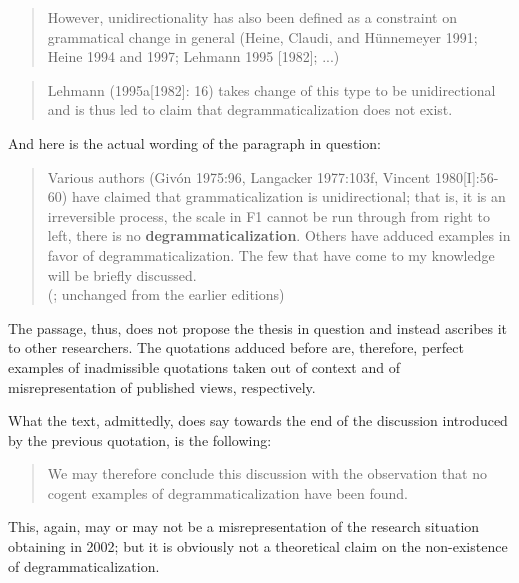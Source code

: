 \begin{quote}
However, unidirectionality has also been defined as a constraint on grammatical change in general (Heine, Claudi, and Hünnemeyer 1991; Heine 1994 and 1997; Lehmann 1995 [1982]; ...)\\
\citep[50]{Norde2009}
\end{quote}

\begin{quote}
Lehmann (1995a[1982]: 16) takes change of this type to be unidirectional and is thus led to claim that degrammaticalization does not exist.\\
\citep[163]{BörjarsEtAl2011}
\end{quote}

\noindent And here is the actual wording of the paragraph in question:

\begin{quote}
Various authors (Givón 1975:96, Langacker 1977:103f, Vincent 1980[I]:56-60) have claimed that grammaticalization is unidirectional; that is, it is an irreversible process, the scale in F1 cannot be run through from right to left, there is no \textbf{degrammaticalization}. Others have adduced examples in favor of degrammaticalization. The few that have come to my knowledge will be briefly discussed.\\
(\citealt[14]{Lehmann2002b}; unchanged from the earlier editions)
\end{quote}

\noindent The passage, thus, does not propose the thesis in question and instead ascribes it to other researchers. The quotations adduced before are, therefore, perfect examples of inadmissible quotations taken out of context and of misrepresentation of published views, respectively.

What the text, admittedly, does say towards the end of the discussion introduced by the previous quotation, is the following:

\begin{quote}
We may therefore conclude this discussion with the observation that no cogent examples of degrammaticalization have been found.\\
\citep[17]{Lehmann2002b}
\end{quote}

\noindent This, again, may or may not be a misrepresentation of the research situation obtaining in 2002; but it is obviously not a theoretical claim on the non-existence of degrammaticalization.

